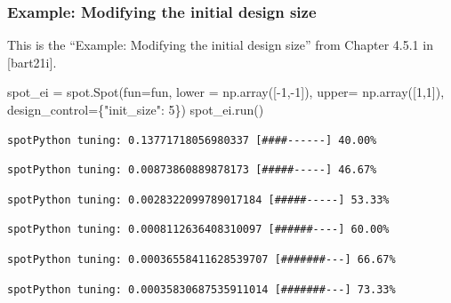 \documentclass[
  letterpaper,
  DIV=11,
  numbers=noendperiod]{scrreprt}
\newenvironment{Shaded}{\begin{snugshade}}{\end{snugshade}}
\newcommand{\DecValTok}[1]{\textcolor[rgb]{0.68,0.00,0.00}{#1}}
\newcommand{\NormalTok}[1]{\textcolor[rgb]{0.00,0.23,0.31}{#1}}
\newcommand{\OperatorTok}[1]{\textcolor[rgb]{0.37,0.37,0.37}{#1}}
\newcommand{\StringTok}[1]{\textcolor[rgb]{0.13,0.47,0.30}{#1}}
\begin{document}
\hypertarget{example-modifying-the-initial-design-size}{%
\subsubsection{Example: Modifying the initial design
size}\label{example-modifying-the-initial-design-size}}

This is the ``Example: Modifying the initial design size'' from Chapter
4.5.1 in {[}bart21i{]}.

\begin{Shaded}
\begin{Highlighting}[]
\NormalTok{spot\_ei }\OperatorTok{=}\NormalTok{ spot.Spot(fun}\OperatorTok{=}\NormalTok{fun,}
\NormalTok{               lower }\OperatorTok{=}\NormalTok{ np.array([}\OperatorTok{{-}}\DecValTok{1}\NormalTok{,}\OperatorTok{{-}}\DecValTok{1}\NormalTok{]),}
\NormalTok{               upper}\OperatorTok{=}\NormalTok{ np.array([}\DecValTok{1}\NormalTok{,}\DecValTok{1}\NormalTok{]),}
\NormalTok{               design\_control}\OperatorTok{=}\NormalTok{\{}\StringTok{"init\_size"}\NormalTok{: }\DecValTok{5}\NormalTok{\})}
\NormalTok{spot\_ei.run()}
\end{Highlighting}
\end{Shaded}

\begin{verbatim}
spotPython tuning: 0.13771718056980337 [####------] 40.00% 
\end{verbatim}

\begin{verbatim}
spotPython tuning: 0.00873860889878173 [#####-----] 46.67% 
\end{verbatim}

\begin{verbatim}
spotPython tuning: 0.0028322099789017184 [#####-----] 53.33% 
\end{verbatim}

\begin{verbatim}
spotPython tuning: 0.0008112636408310097 [######----] 60.00% 
\end{verbatim}

\begin{verbatim}
spotPython tuning: 0.00036558411628539707 [#######---] 66.67% 
\end{verbatim}

\begin{verbatim}
spotPython tuning: 0.00035830687535911014 [#######---] 73.33% 
\end{verbatim}
\end{document}
